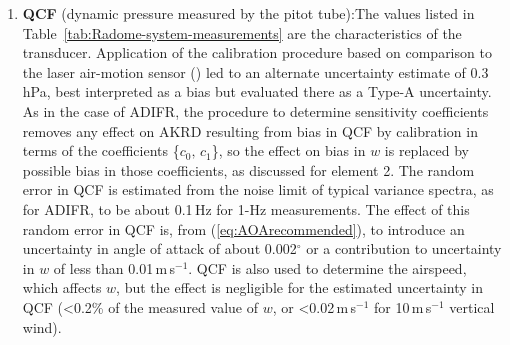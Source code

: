 \documentclass[12pt,twoside,english]{article}\usepackage[]{graphicx}\usepackage[]{color}
\let\OrgIndex\index
\renewcommand*{\index}[1]{\OrgIndex{#1}}
\begin{document}
\begin{enumerate}
\item \textbf{QCF} (dynamic pressure measured by the pitot tube):The values listed in Table~\ref{tab:Radome-system-measurements} are the characteristics of the transducer. Application of the calibration procedure based on comparison to the laser air-motion sensor (\citet{CooperEtAl2014}) led to an alternate uncertainty estimate of 0.3\,hPa, best interpreted as a bias but evaluated there as a Type-A uncertainty. As in the case of ADIFR, the procedure to determine sensitivity coefficients removes any effect on AKRD resulting from bias in QCF by calibration in terms of the coefficients \{$c_{0},\,c_{1}$\}, so the effect on bias in $w$ is replaced by possible bias in those coefficients, as discussed for element 2. The random error in QCF is estimated from the noise limit of typical variance spectra, as for ADIFR, to be about 0.1\,Hz for 1-Hz measurements. The effect of this random error in QCF is, from (\ref{eq:AOArecommended}), to introduce an uncertainty in angle of attack of about 0.002$^{\circ}$ or a contribution to uncertainty in $w$ of less than 0.01\,m\,s$^{-1}$. QCF is also used to determine the airspeed, which affects $w$, but the effect is negligible for the estimated uncertainty in QCF (<0.2\% of the measured value of $w$, or <0.02\,m\,s$^{-1}$ for 10\,m\,s$^{-1}$ vertical wind).  

\end{enumerate}
\end{document}
